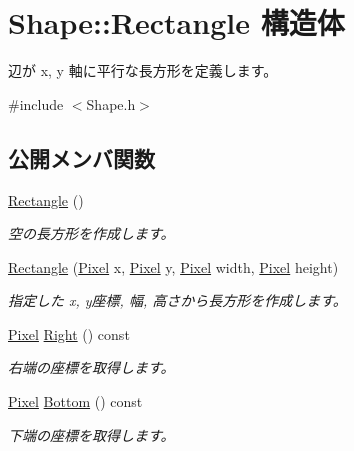 \hypertarget{struct_shape_1_1_rectangle}{}\section{Shape\+:\+:Rectangle 構造体}
\label{struct_shape_1_1_rectangle}


辺が x, y 軸に平行な長方形を定義します。 




{\ttfamily \#include $<$Shape.\+h$>$}

\subsection*{公開メンバ関数}
\begin{DoxyCompactItemize}
\item 
\hyperlink{struct_shape_1_1_rectangle_a6433b9b2a64ba5dbf834d569a1c9ab7d}{Rectangle} ()
\begin{DoxyCompactList}\small\item\em 空の長方形を作成します。\end{DoxyCompactList}\item 
\hyperlink{struct_shape_1_1_rectangle_aae0f0e65b169e845041f3cc891350608}{Rectangle} (\hyperlink{_shape_8h_a2a49d9a10651b486dec23c8771d3ea98}{Pixel} x, \hyperlink{_shape_8h_a2a49d9a10651b486dec23c8771d3ea98}{Pixel} y, \hyperlink{_shape_8h_a2a49d9a10651b486dec23c8771d3ea98}{Pixel} width, \hyperlink{_shape_8h_a2a49d9a10651b486dec23c8771d3ea98}{Pixel} height)
\begin{DoxyCompactList}\small\item\em 指定した x, y座標, 幅, 高さから長方形を作成します。\end{DoxyCompactList}\item 
\hyperlink{_shape_8h_a2a49d9a10651b486dec23c8771d3ea98}{Pixel} \hyperlink{struct_shape_1_1_rectangle_ae588a514e7cbf3bfff4c5d7a6b80b0fc}{Right} () const 
\begin{DoxyCompactList}\small\item\em 右端の座標を取得します。\end{DoxyCompactList}\item 
\hyperlink{_shape_8h_a2a49d9a10651b486dec23c8771d3ea98}{Pixel} \hyperlink{struct_shape_1_1_rectangle_a4e83be708e529907200fdcc391ff2859}{Bottom} () const 
\begin{DoxyCompactList}\small\item\em 下端の座標を取得します。\end{DoxyCompactList}\item 

\end{DoxyCompactItemize}
